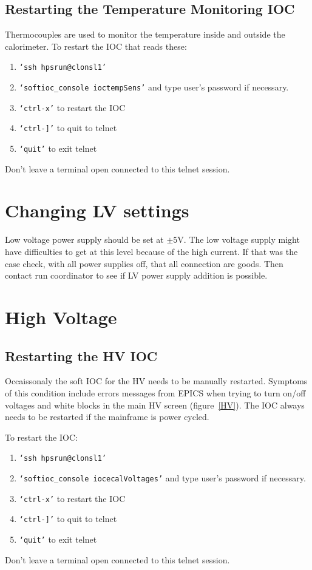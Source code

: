 \documentclass[12pt]{article}
\begin{document}
{   \subsection{Restarting the Temperature Monitoring IOC}
   Thermocouples are used to monitor the temperature inside and outside the calorimeter.  To restart the IOC that reads these:
   {\footnotesize
   \begin{enumerate}
       \item \texttt{`ssh hpsrun@clonsl1'}
       \item \texttt{`softioc\_console ioctempSens'} and type user's password if necessary.
       \item \texttt{`ctrl-x'} to restart the IOC
       \item \texttt{`ctrl-]'} to quit to telnet
       \item \texttt{`quit'} to exit telnet
   \end{enumerate}
   }
Don't leave a terminal open connected to this telnet session.



   \section{Changing LV settings}
      Low voltage power supply should be set at $\pm5$V. The low voltage supply might have difficulties to get at this level because of the high current. If that was the case check, with all power supplies off, that all connection are goods. Then contact run coordinator to see if LV power supply addition is possible. 

   \section{High Voltage}
   \subsection{Restarting the HV IOC}
   Occaissonaly the soft IOC for the HV needs to be manually restarted.  Symptoms of this condition include errors messages from EPICS when trying to turn on/off voltages and white blocks in the main HV screen (figure~\ref{HV}).  The IOC always needs to be restarted if the mainframe is power cycled.  

   To restart the IOC:
   {\footnotesize
   \begin{enumerate}
       \item \texttt{`ssh hpsrun@clonsl1'}
       \item \texttt{`softioc\_console iocecalVoltages'} and type user's password if necessary.
       \item \texttt{`ctrl-x'} to restart the IOC
       \item \texttt{`ctrl-]'} to quit to telnet
       \item \texttt{`quit'} to exit telnet
   \end{enumerate}
   }
Don't leave a terminal open connected to this telnet session.
   
}
\end{document}
